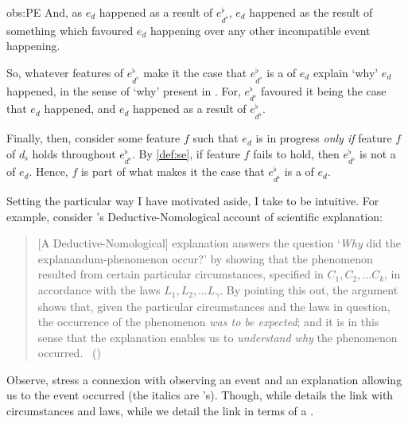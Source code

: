 \begin{note}
\begin{motivation}{obs:PE}
    And, as \(e_{d}\) happened as a result of \(e^{\flat}_{d^{\flat}}\), \(e_{d}\) happened as the result of something which favoured \(e_{d}\) happening over any other incompatible event happening.

    So, whatever features of \(e^{\flat}_{d^{\flat}}\) make it the case that \(e^{\flat}_{d^{\flat}}\) is a \se{} of \(e_{d}\) explain `why' \(e_{d}\) happened, in the sense of `why' present in \qWhy{}.
    For, \(e^{\flat}_{d^{\flat}}\) favoured it being the case that \(e_{d}\) happened, and \(e_{d}\) happened as a result of \(e^{\flat}_{d^{\flat}}\).
    \medskip

    \noindent%
    Finally, then, consider some feature \(f\) such that \(e_{d}\) is in progress \emph{only if} feature \(f\) of \(d_{\flat}\) holds throughout \(e^{\flat}_{d^{\flat}}\).
    By \autoref{def:se}, if feature \(f\) fails to hold, then \(e^{\flat}_{d^{\flat}}\) is not a \se{} of \(e_{d}\).
    Hence, \(f\) is part of what makes it the case that \(e^{\flat}_{d^{\flat}}\) is a \se{} of \(e_{d}\).\newline
  \end{motivation}

  \noindent%
  Setting the particular way I have motivated \progEx{} aside, I take \progEx{} to be intuitive.
  For example, consider \citeauthor{Hempel:1965aa}'s Deductive-Nomological account of scientific explanation:
    \begin{quote}
      [A Deductive-Nomological] explanation answers the question
      `\emph{Why} did the explanandum-phenomenon occur?'
      by showing that the phenomenon resulted from certain particular circumstances, specified in \(C_{1}, C_{2}, \dots C_{k}\), in accordance with the laws \(L_{1}, L_{2}, \dots L_{\gamma}\).
      By pointing this out, the argument shows that, given the particular circumstances and the laws in question, the occurrence of the phenomenon \emph{was to be expected}; and it is in this sense that the explanation enables us to \emph{understand why} the phenomenon occurred.%
      \mbox{ }\hfill\mbox{(\citeyear[337]{Hempel:1965aa})}
    \end{quote}
    Observe, \citeauthor{Hempel:1965aa} stress a connexion with observing an event  and an explanation allowing us to  the event occurred (the italics are \citeauthor{Hempel:1965aa}'s).
    Though, while \citeauthor{Hempel:1965aa} details the link with circumstances and laws, while we detail the link in terms of a \se{}.
\end{note}


